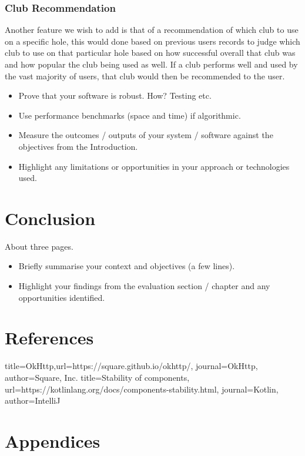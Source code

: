\subsection{Club Recommendation}
Another feature we wish to add is that of a recommendation of which club to use on a specific hole, this would done based on previous users records to judge which club to use on that particular hole based on how successful overall that club was and how popular the club being used as well. If a club performs well and used by the vast majority of users, that club would then be recommended to the user.
\begin{itemize}
\item Prove that your software is robust. How? Testing etc.
\item Use performance benchmarks (space and time) if algorithmic.
\item Measure the outcomes / outputs of your system / software against the objectives from the Introduction.
\item Highlight any limitations or opportunities in your approach or technologies used.
\end{itemize}
\chapter{Conclusion}
About three pages.
\begin{itemize}
\item Briefly summarise your context and objectives (a few lines).
\item Highlight your findings from the evaluation section / chapter and any opportunities identified.
\end{itemize}
\chapter{References}

\begin{thebibliography}{9}
 {title={OkHttp},url={https://square.github.io/okhttp/}, journal={OkHttp}, author={Square, Inc.}}
 {title={Stability of components},
url={https://kotlinlang.org/docs/components-stability.html}, journal={Kotlin}, author={IntelliJ}}

\end{thebibliography}
\chapter{Appendices}
